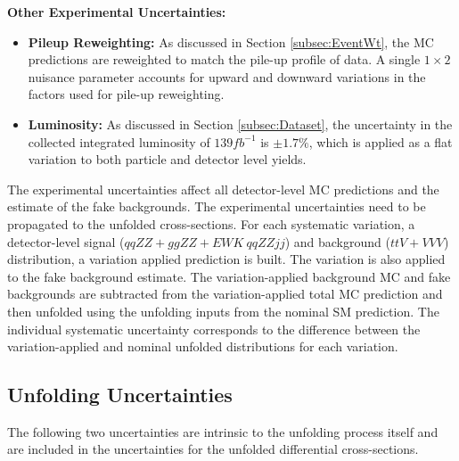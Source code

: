 \textbf{Other Experimental Uncertainties: }
\begin{itemize}
    \item{\textbf{Pileup Reweighting:} As discussed in Section \ref{subsec:EventWt}, the MC predictions are reweighted to match the pile-up profile of data. A single $1\times2$ nuisance parameter accounts for upward and downward variations in the factors used for pile-up reweighting. }
    \item{\textbf{Luminosity:} As discussed in Section \ref{subsec:Dataset}, the uncertainty in the collected integrated luminosity of $139 fb^{-1}$ is $\pm1.7\%$, which is applied as a flat variation to both particle and detector level yields. } 
\end{itemize}

The experimental uncertainties affect all detector-level MC predictions and the estimate of the fake backgrounds. The experimental uncertainties need to be propagated to the unfolded cross-sections. For each systematic variation, a detector-level signal ($qqZZ+ggZZ+EWK~qqZZjj$) and background ($ttV+VVV$) distribution, a variation applied prediction is built. The variation is also applied to the fake background estimate. The variation-applied background MC and fake backgrounds are subtracted from the variation-applied total MC prediction and then unfolded using the unfolding inputs from the nominal SM prediction. The individual systematic uncertainty corresponds to the difference between the variation-applied and nominal unfolded distributions for each variation.  

\subsection{Unfolding Uncertainties}
\label{subsec:UnfoldingUnc}
The following two uncertainties are intrinsic to the unfolding process itself and are included in the uncertainties for the unfolded differential cross-sections.

